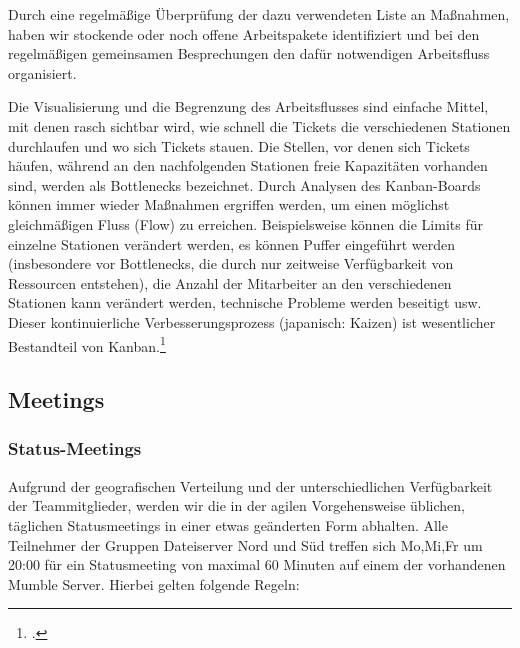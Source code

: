Durch eine regelmäßige Überprüfung der dazu verwendeten Liste an Maßnahmen,
haben wir stockende oder noch offene Arbeitspakete identifiziert und bei den
regelmäßigen gemeinsamen Besprechungen den dafür notwendigen Arbeitsfluss
organisiert.

Die Visualisierung und die Begrenzung des Arbeitsflusses sind einfache Mittel,
mit denen rasch sichtbar wird, wie schnell die Tickets die verschiedenen
Stationen durchlaufen und wo sich Tickets stauen. Die Stellen, vor denen sich
Tickets häufen, während an den nachfolgenden Stationen freie Kapazitäten
vorhanden sind, werden als Bottlenecks bezeichnet. Durch Analysen des
Kanban-Boards können immer wieder Maßnahmen ergriffen werden, um einen
möglichst gleichmäßigen Fluss (Flow) zu erreichen. Beispielsweise können die
Limits für einzelne Stationen verändert werden, es können Puffer eingeführt
werden (insbesondere vor Bottlenecks, die durch nur zeitweise Verfügbarkeit von
Ressourcen entstehen), die Anzahl der Mitarbeiter an den verschiedenen
Stationen kann verändert werden, technische Probleme werden beseitigt usw.
Dieser kontinuierliche Verbesserungsprozess (japanisch: Kaizen) ist
wesentlicher Bestandteil von Kanban.\footcite{wikiKanban}\\

\subsection{Meetings}
\subsubsection{Status-Meetings}
Aufgrund der geografischen Verteilung und der unterschiedlichen Verfügbarkeit der Teammitglieder, werden wir die in der agilen Vorgehensweise üblichen, täglichen Statusmeetings in einer etwas geänderten Form abhalten. Alle Teilnehmer der Gruppen Dateiserver Nord und Süd treffen sich Mo,Mi,Fr um 20:00 für ein Statusmeeting von maximal 60 Minuten auf einem der vorhandenen Mumble Server. Hierbei gelten folgende Regeln:

